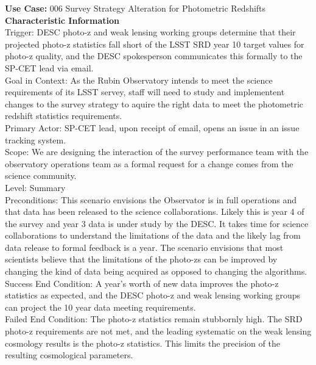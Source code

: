 {\bf Use Case:} 006 Survey Strategy Alteration for Photometric Redshifts \\

{\bf Characteristic Information} \\
Trigger: DESC photo-z and weak lensing working groups determine that their projected photo-z statistics fall short of the LSST SRD year 10 target values for photo-z quality, and the DESC spokesperson communicates this formally to the SP-CET lead via email. \\
Goal in Context: As the Rubin Observatory intends to meet the science requirements of its LSST servey, staff will need to study and implementent changes to the survey strategy to aquire the right data to meet the photometric redshift statistics requirements. \\
Primary Actor: SP-CET lead, upon receipt of email, opens an issue in an issue tracking system. \\
Scope: We are designing the interaction of the survey performance team with the observatory operations team as a formal request for a change comes from the science community. \\
Level: Summary \\
Preconditions: This scenario envisions the Observator is in full operations and that data has been released to the science collaborations.  Likely this is year 4 of the survey and year 3 data is under study by the DESC.  It takes time for science collaborations to understand the limitations of the data and the likely lag from data release to formal feedback is a year. The scenario envisions that most scientists believe that the limitations of the photo-zs can be improved by changing the kind of data being acquired as opposed to changing the algorithms. \\
Success End Condition: A year's worth of new data improves the photo-z statistics as expected, and the DESC photo-z and weak lensing working groups can project the 10 year data meeting requirements. \\
Failed End Condition: The photo-z statistics remain stubbornly high.  The SRD photo-z requirements are not met, and the leading systematic on the weak lensing cosmology results is the photo-z statistics.  This limits the precision of the resulting cosmological parameters. \\

